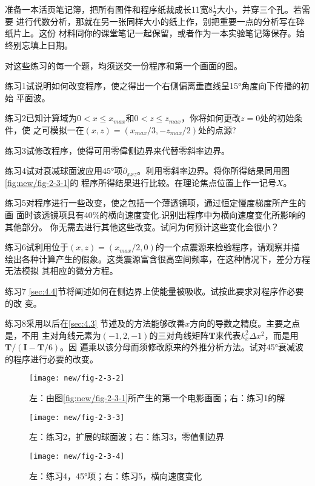 准备一本活页笔记簿，把所有图件和程序纸裁成长11宽$8\frac{1}{2}$大小，并穿三个孔。若需要
进行代数分析，那就在另一张同样大小的纸上作，别把重要一点的分析写在碎纸片上。这份
材料同你的课堂笔记一起保留，或者作为一本实验笔记簿保存。始终别忘填上日期。

对这些练习的每一个题，均须送交一份程序和第一个画面的图。

练习1试说明如何改变程序，使之得出一个右侧偏离垂直线呈15°角度向下传播的初始
平面波。

练习2已知计算域为$0<x\leq x_{max}$和$0<z\leq z_{max}$，你将如何更改$z=0$处的初始条件，使
之可模拟一在$(x,z) =(x_{max}/3,-z_{max}/2)$处的点源?

练习3试修改程序，使得可用零偉侧边界来代替零斜率边界。

练习4试对衰减球面波应用45°项$\partial _{xxz}$。利用零斜率边界。将你所得结果同用图\ref{fig:new/fig-2-3-1}的
程序所得结果进行比较。在理论焦点位置上作一记号$X$。

练习5对程序进行一些改变，使之包括一个薄透镜项，通过恒定慢度梯度所产生的画
面时该透镜项具有40\%的横向速度变化.识别出程序中为横向速度变化所影响的其他部分。
你无需去进行其他这些改变。试问为何预计这些变化会很小？

练习6试利用位于$(x,z)=(x_{max}/2,0)$的一个点震源来检验程序，请观察并描
绘出各种计算产生的假象。这类震源富含很高空间频率，在这种情况下，差分方程无法模拟
其相应的微分方程。

练习7 \ref{sec:4.4}节将阐述如何在侧边界上使能量被吸收。试按此要求对程序作必要的改 变。

练习8采用以后在\ref{sec:4.3}
节述及的方法能够改善$x$方向的导数之精度。主要之点是，不用
主对角线元素为$(-1,2,-1)$的三对角线矩阵$\mathbf{T}$来代表$k_x^2\Delta x^2$，而是用$\mathbf{T}/(\mathbf{I}-\mathbf{T}/6)$。因
遍乘以该分母而须修改原来的外推分析方法。试对45°衰减波的程序进行必要的改变。
\begin{figure}[H]
\centering
\texttt{[image: new/fig-2-3-2]}
\caption[2-3-2]{左：由图\ref{fig:new/fig-2-3-1}所产生的第一个电影画面；右：练习1的解}
\label{fig:new/fig-2-3-2}
\end{figure}

\begin{figure}[H]
\centering
\texttt{[image: new/fig-2-3-3]}
\caption[2-3-3]{左：练习2，扩展的球面波；右：练习3，零值侧边界}
\label{fig:new/fig-2-3-3}
\end{figure}

\begin{figure}[H]
\centering
\texttt{[image: new/fig-2-3-4]}
\caption[2-3-4]{左：练习4，45°项；右：练习5，横向速度变化}
\label{fig:new/fig-2-3-4}
\end{figure}


